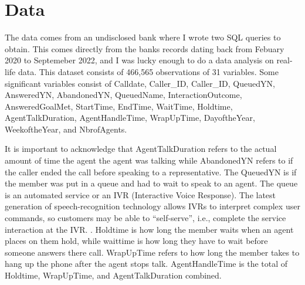 \documentclass[12pt]{article}
\begin{document}
\section*{Data}
\begin{sloppypar}
  The data comes from an undisclosed bank where I wrote two SQL queries to obtain. This comes directly from the banks records dating back from Febuary 2020
  to Septemeber 2022, and I was lucky enough to do a data analysis on real-life data. This dataset consists of 466,565 observations of 31 variables. 
  Some significant variables consist of Calldate, Caller_ID, Caller_ID, QueuedYN, AnsweredYN, AbandonedYN, QueuedName, InteractionOutcome, 
  AnsweredGoalMet, StartTime, EndTime, WaitTime, Holdtime, AgentTalkDuration, AgentHandleTime, WrapUpTime, DayoftheYear,
  WeekoftheYear, and NbrofAgents.
\end{sloppypar}
  It is important to acknowledge that AgentTalkDuration refers to the actual amount of time the agent the agent was talking while
AbandonedYN refers to if the caller ended the call before speaking to a representative. The QueuedYN is if the member was put in a queue and had to wait to speak to an agent.
The queue is an automated service or an IVR (Interactive Voice Response). The latest generation of speech-recognition technology allows
IVRs to interpret complex user commands, so customers may be able to “self-serve”, i.e., complete the service interaction at the IVR. \citep{avramidis2005modeling}.
Holdtime is how long the member waits when an agent places on them hold, while waittime is how long they have to wait before someone answers there call.
WrapUpTime refers to how long the member takes to hang up the phone after the agent stops talk. AgentHandleTime is the total of Holdtime, WrapUpTime, and AgentTalkDuration combined.
\end{document}
